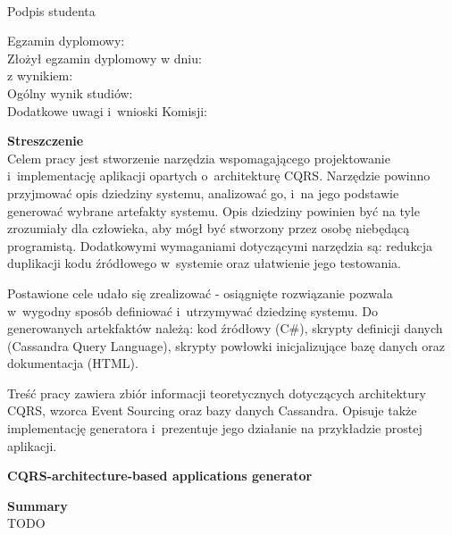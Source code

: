 \vspace{2cm}

\begin{flushright}
 \begin{minipage}{5cm}
  \dotfill \\[-0.7cm]
  \begin{center}
  \small Podpis studenta
  \end{center}
 \end{minipage}
\end{flushright}

\vspace{4cm}

\begin{flushleft}
 Egzamin dyplomowy: \\
 Złożył egzamin dyplomowy w dniu: \dotfill \\
 z wynikiem: \dotfill \\
 Ogólny wynik studiów: \dotfill \\
 Dodatkowe uwagi i~wnioski Komisji: \dotfill \\
 \hspace{0cm} \dotfill
\end{flushleft}

 
\newpage
\thispagestyle{empty}

\textbf{Streszczenie} \\

Celem pracy jest stworzenie narzędzia wspomagającego projektowanie i~implementację aplikacji opartych o~architekturę CQRS.
Narzędzie powinno przyjmować opis dziedziny systemu, analizować go, i~na jego podstawie generować wybrane artefakty systemu.
Opis dziedziny powinien być na tyle zrozumiały dla człowieka, aby mógł być stworzony przez osobę niebędącą programistą.
Dodatkowymi wymaganiami dotyczącymi narzędzia są: redukcja duplikacji kodu źródłowego w~systemie oraz ułatwienie jego testowania.

Postawione cele udało się zrealizować - osiągnięte rozwiązanie pozwala w~wygodny sposób definiować i~utrzymywać dziedzinę systemu.
Do generowanych artekfaktów należą: kod źródłowy (C\#), skrypty definicji danych (Cassandra Query Language), skrypty powłowki inicjalizujące bazę danych oraz dokumentacja (HTML).

Treść pracy zawiera zbiór informacji teoretycznych dotyczących architektury CQRS, wzorca Event Sourcing oraz bazy danych Cassandra.
Opisuje także implementację generatora i~prezentuje jego działanie na przykładzie prostej aplikacji.




\begin{center}
 \large \textbf{CQRS-architecture-based applications generator}
\end{center}

\vspace*{1cm}

\textbf{Summary} \\

TODO

